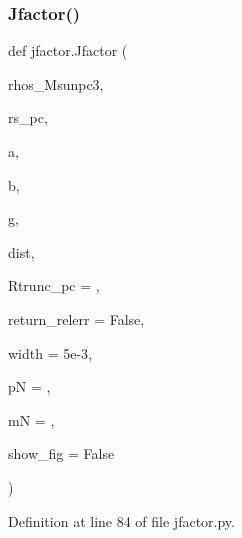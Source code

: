 \subsubsection{\texorpdfstring{Jfactor()}{Jfactor()}}
{\footnotesize\ttfamily def jfactor.\+Jfactor (\begin{DoxyParamCaption}\item[{}]{rhos\+\_\+\+Msunpc3,  }\item[{}]{rs\+\_\+pc,  }\item[{}]{a,  }\item[{}]{b,  }\item[{}]{g,  }\item[{}]{dist,  }\item[{}]{Rtrunc\+\_\+pc = {},  }\item[{}]{return\+\_\+relerr = {\ttfamily False},  }\item[{}]{width = {\ttfamily 5e-\/3},  }\item[{}]{pN = {},  }\item[{}]{mN = {},  }\item[{}]{show\+\_\+fig = {\ttfamily False} }\end{DoxyParamCaption})}



Definition at line 84 of file jfactor.\+py.


